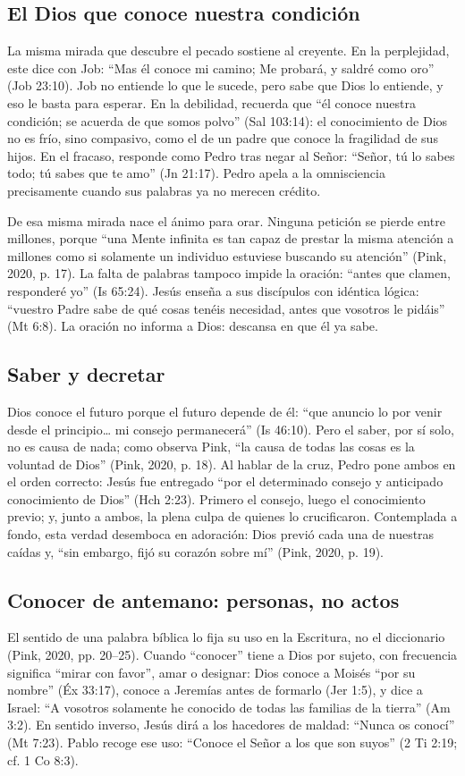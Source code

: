 \subsection{El Dios que conoce nuestra condición}
La misma mirada que descubre el pecado sostiene al creyente. En la perplejidad, este dice con Job: ``Mas él conoce mi camino; Me probará, y saldré como oro'' (Job 23:10). Job no entiende lo que le sucede, pero sabe que Dios lo entiende, y eso le basta para esperar. En la debilidad, recuerda que ``él conoce nuestra condición; se acuerda de que somos polvo'' (Sal 103:14): el conocimiento de Dios no es frío, sino compasivo, como el de un padre que conoce la fragilidad de sus hijos. En el fracaso, responde como Pedro tras negar al Señor: ``Señor, tú lo sabes todo; tú sabes que te amo'' (Jn 21:17). Pedro apela a la omnisciencia precisamente cuando sus palabras ya no merecen crédito.

De esa misma mirada nace el ánimo para orar. Ninguna petición se pierde entre millones, porque ``una Mente infinita es tan capaz de prestar la misma atención a millones como si solamente un individuo estuviese buscando su atención'' (Pink, 2020, p. 17). La falta de palabras tampoco impide la oración: ``antes que clamen, responderé yo'' (Is 65:24). Jesús enseña a sus discípulos con idéntica lógica: ``vuestro Padre sabe de qué cosas tenéis necesidad, antes que vosotros le pidáis'' (Mt 6:8). La oración no informa a Dios: descansa en que él ya sabe.

\subsection{Saber y decretar}
Dios conoce el futuro porque el futuro depende de él: ``que anuncio lo por venir desde el principio\ldots{} mi consejo permanecerá'' (Is 46:10). Pero el saber, por sí solo, no es causa de nada; como observa Pink, ``la causa de todas las cosas es la voluntad de Dios'' (Pink, 2020, p. 18). Al hablar de la cruz, Pedro pone ambos en el orden correcto: Jesús fue entregado ``por el determinado consejo y anticipado conocimiento de Dios'' (Hch 2:23). Primero el consejo, luego el conocimiento previo; y, junto a ambos, la plena culpa de quienes lo crucificaron. Contemplada a fondo, esta verdad desemboca en adoración: Dios previó cada una de nuestras caídas y, ``sin embargo, fijó su corazón sobre mí'' (Pink, 2020, p. 19).

\subsection{Conocer de antemano: personas, no actos}
El sentido de una palabra bíblica lo fija su uso en la Escritura, no el diccionario (Pink, 2020, pp. 20--25). Cuando ``conocer'' tiene a Dios por sujeto, con frecuencia significa ``mirar con favor'', amar o designar: Dios conoce a Moisés ``por su nombre'' (Éx 33:17), conoce a Jeremías antes de formarlo (Jer 1:5), y dice a Israel: ``A vosotros solamente he conocido de todas las familias de la tierra'' (Am 3:2). En sentido inverso, Jesús dirá a los hacedores de maldad: ``Nunca os conocí'' (Mt 7:23). Pablo recoge ese uso: ``Conoce el Señor a los que son suyos'' (2 Ti 2:19; cf. 1 Co 8:3).

